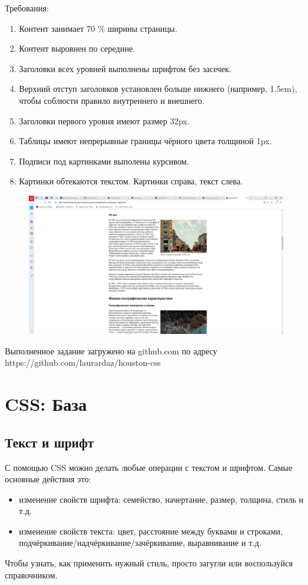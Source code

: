\documentclass[14pt]{extreport}
\begin{document}
Требования:
\begin{enumerate}
\item Контент занимает 70 \% ширины страницы.
\item Контент выровнен по середине.
\item Заголовки всех уровней выполнены шрифтом без засечек.
\item Верхний отступ заголовков установлен больше нижнего (например, 1.5em), чтобы соблюсти правило внутреннего и внешнего.
\item Заголовки первого уровня имеют размер 32px.
\item Таблицы имеют непрерывные границы чёрного цвета толщиной 1px.
\item Подписи под картинками выполены курсивом.
\item Картинки обтекаются текстом. Картинки справа, текст слева.

\end{enumerate}
\begin{figure}[H]
\centerline{\includegraphics[width=0.8\linewidth]{pics_practice/houston2.png}}
\caption{}
\label{8}
\end{figure}

Выполненное задание загружено на github.com по адресу https://github.com/laurardaz/houston-css





\chapter{CSS: База}

\section{Текст и шрифт}

С помощью CSS можно делать любые операции с текстом и шрифтом. Самые основные действия это:
\begin{itemize}
\item изменение свойств шрифта: семейство, начертание, размер, толщина, стиль и т.д.
\item изменение свойств текста: цвет, расстояние между буквами и строками, подчёркивание/надчёркивание/зачёркивание, выравнивание и т.д.
\end{itemize}
Чтобы узнать, как применить нужный стиль, просто загугли или воспользуйся справочником.
\end{document}
